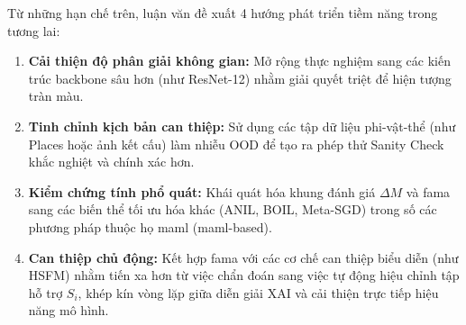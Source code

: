 Từ những hạn chế trên, luận văn đề xuất 4 hướng phát triển tiềm năng trong tương lai:
\begin{enumerate}
    \item \textbf{Cải thiện độ phân giải không gian:} Mở rộng thực nghiệm sang các kiến trúc backbone sâu hơn (như ResNet-12) nhằm giải quyết triệt để hiện tượng tràn màu.
    \item \textbf{Tinh chỉnh kịch bản can thiệp:} Sử dụng các tập dữ liệu phi-vật-thể (như Places hoặc ảnh kết cấu) làm nhiễu OOD để tạo ra phép thử Sanity Check khắc nghiệt và chính xác hơn.
    \item \textbf{Kiểm chứng tính phổ quát:} Khái quát hóa khung đánh giá $\Delta M$ và \acrshort{fama} sang các biến thể tối ưu hóa khác (ANIL, BOIL, Meta-SGD) trong số các phương pháp thuộc họ \acrshort{maml} (\acrshort{maml}-based).
    \item \textbf{Can thiệp chủ động:} Kết hợp \acrshort{fama} với các cơ chế can thiệp biểu diễn (như HSFM) nhằm tiến xa hơn từ việc chẩn đoán sang việc tự động hiệu chỉnh tập hỗ trợ $S_i$, khép kín vòng lặp giữa diễn giải XAI và cải thiện trực tiếp hiệu năng mô hình.
\end{enumerate}
